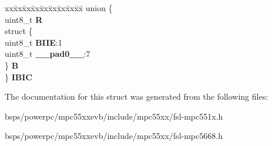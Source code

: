\begin{DoxyCompactItemize}
\begin{tabbing}
\end{tabbing}\item 
\mbox{\label{structI2C__tag_ac529fd2ac920909e9ef618ae3e2c7422}} 
\begin{tabbing}
xx\=xx\=xx\=xx\=xx\=xx\=xx\=xx\=xx\=\kill
union \{\\
\>uint8\_t {\bfseries R}\\
\>struct \{\\
\>\>uint8\_t {\bfseries BIIE}:1\\
\>\>uint8\_t {\bfseries \_\_pad0\_\_}:7\\
\>\} {\bfseries B}\\
\} {\bfseries IBIC}\\

\end{tabbing}\end{DoxyCompactItemize}


The documentation for this struct was generated from the following files\+:\begin{DoxyCompactItemize}
\item 
bsps/powerpc/mpc55xxevb/include/mpc55xx/fsl-\/mpc551x.\+h\item 
bsps/powerpc/mpc55xxevb/include/mpc55xx/fsl-\/mpc5668.\+h\end{DoxyCompactItemize}
